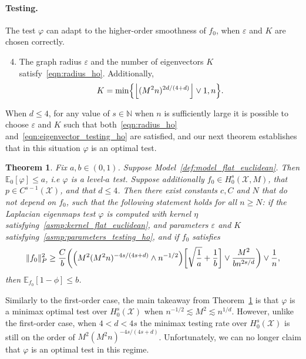 \documentclass{article}
\newcommand{\floor}[1]{\left\lfloor #1 \right\rfloor}
\newcommand{\1}{\mathbf{1}}
\newcommand{\mc}[1]{\mathcal{#1}}
\newcommand{\Ebb}{\mathbb{E}}
\theoremstyle{alden}
\theoremstyle{aldenthm}
\newtheorem{theorem}{Theorem}
\theoremstyle{definition}
\theoremstyle{remark}
\begin{document}
\paragraph{Testing.} The test $\varphi$ can adapt to the higher-order smoothness of $f_0$, when $\varepsilon$ and $K$ are chosen correctly.
\begin{enumerate}[label=(P\arabic*)]
	\setcounter{enumi}{3}
	\item 
	\label{asmp:parameters_testing_ho}
	The graph radius $\varepsilon$ and the number of eigenvectors $K$ satisfy~\eqref{eqn:radius_ho}. Additionally,
	\begin{equation}
	\label{eqn:eigenvector_testing_ho}
	K = \min\Bigl\{\floor{(M^2n)^{2d/(4 + d)}} \vee 1, n\Bigr\}.
	\end{equation}
\end{enumerate}
When $d \leq 4$, for any value of $s \in \mathbb{N}$ when $n$ is sufficiently large it is possible to choose $\varepsilon$ and $K$ such that both~\eqref{eqn:radius_ho} and~\eqref{eqn:eigenvector_testing_ho} are satisfied, and our next theorem establishes that in this situation $\varphi$ is an optimal test.
\begin{theorem}
	\label{thm:laplacian_eigenmaps_testing_ho}
	Fix $a,b \in (0,1)$. Suppose Model~\ref{def:model_flat_euclidean}. Then $\mathbb{E}_0[\varphi] \leq a$, i.e $\varphi$ is a level-$a$ test. Suppose additionally $f_0 \in H_0^s(\mc{X},M)$, that $p \in C^{s-1}(\mc{X})$, and that $d \leq 4$. Then there exist constants $c,C$ and $N$ that do not depend on $f_0$, such that the following statement holds for all $n \geq N$: if the Laplacian eigenmaps test $\varphi$ is computed with kernel $\eta$ satisfying~\ref{asmp:kernel_flat_euclidean}, and parameters $\varepsilon$ and $K$ satisfying~\ref{asmp:parameters_testing_ho}, and if $f_0$ satisfies
	\begin{equation}
	\label{eqn:laplacian_eigenmaps_testing_criticalradius_ho}
	\|f_0\|_P^2 \geq \frac{C}{b}\biggl(\Bigl(M^2(M^2n)^{-4s/(4s + d) } \wedge n^{-1/2}\Bigr)\biggl[\sqrt{\frac{1}{a}} + \frac{1}{b}\biggr] \vee \frac{M^2}{b n^{2s/d}} \biggr) \vee \frac{1}{n},
	\end{equation}
	then $\Ebb_{f_0}[1 - \phi] \leq b$.
\end{theorem}
Similarly to the first-order case, the main takeaway from Theorem~\ref{thm:laplacian_eigenmaps_testing_ho} is that $\varphi$ is a minimax optimal test over $H_0^s(\mc{X})$ when $n^{-1/2} \lesssim M^2 \lesssim n^{1/d}$. However, unlike the first-order case, when $4 < d < 4s$ the minimax testing rate over $H_0^s(\mc{X})$ is still on the order of $M^2(M^2n)^{-4s/(4s + d)}$. Unfortunately, we can no longer claim that $\varphi$ is an optimal test in this regime.
\end{document}
